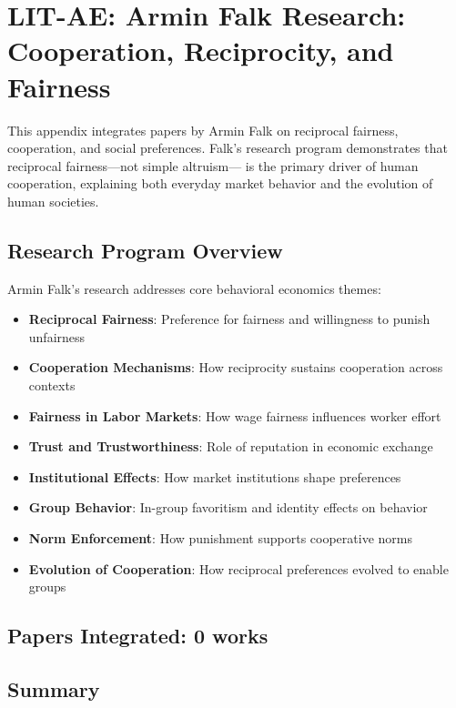 \section{LIT-AE: Armin Falk Research: Cooperation, Reciprocity, and Fairness}
\label{app:litae}

This appendix integrates papers by Armin Falk on reciprocal fairness, cooperation, and social
preferences. Falk's research program demonstrates that reciprocal fairness—not simple altruism—
is the primary driver of human cooperation, explaining both everyday market behavior and the
evolution of human societies.

\subsection{Research Program Overview}

Armin Falk's research addresses core behavioral economics themes:

\begin{itemize}
  \item \textbf{Reciprocal Fairness}: Preference for fairness and willingness to punish unfairness
  \item \textbf{Cooperation Mechanisms}: How reciprocity sustains cooperation across contexts
  \item \textbf{Fairness in Labor Markets}: How wage fairness influences worker effort
  \item \textbf{Trust and Trustworthiness}: Role of reputation in economic exchange
  \item \textbf{Institutional Effects}: How market institutions shape preferences
  \item \textbf{Group Behavior}: In-group favoritism and identity effects on behavior
  \item \textbf{Norm Enforcement}: How punishment supports cooperative norms
  \item \textbf{Evolution of Cooperation}: How reciprocal preferences evolved to enable groups
\end{itemize}

\subsection{Papers Integrated: 0 works}


\subsection{Summary}

